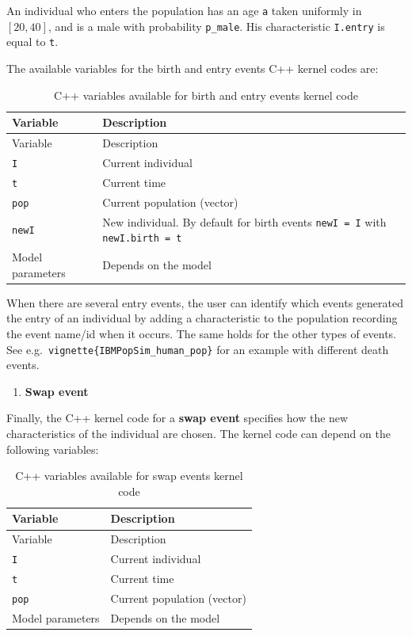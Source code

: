 \begin{Shaded}
\begin{Highlighting}[]
\end{Highlighting}
\end{Shaded}

An individual who enters the population has an age \texttt{a} taken uniformly in \([20,40]\), and is a male with probability \texttt{p\_male}. His characteristic \texttt{I.entry} is equal to \texttt{t}.

The available variables for the birth and entry events C++ kernel codes are:

\begin{longtable}[]{@{}ll@{}}
\caption{C++ variables available for birth and entry events kernel code}\tabularnewline
\toprule
Variable & Description\tabularnewline
\midrule
\endfirsthead
\toprule
Variable & Description\tabularnewline
\midrule
\endhead
\texttt{I} & Current individual\tabularnewline
\texttt{t} & Current time\tabularnewline
\texttt{pop} & Current population (vector)\tabularnewline
\texttt{newI} & New individual. By default for birth events \texttt{newI\ =\ I} with \texttt{newI.birth\ =\ t}\tabularnewline
Model parameters & Depends on the model\tabularnewline
\bottomrule
\end{longtable}

When there are several entry events, the user can identify which events generated the entry of an individual by adding a characteristic to the population recording the event name/id when it occurs. The same holds for the other types of events. See e.g.~\texttt{vignette\{\textquotesingle{}IBMPopSim\_human\_pop\textquotesingle{}\}} for an example with different death events.

\begin{enumerate}
\def\labelenumi{\arabic{enumi}.}
\setcounter{enumi}{4}
\tightlist
\item
  \textbf{Swap event}
\end{enumerate}

Finally, the C++ kernel code for a \textbf{swap event} specifies how the new characteristics of the individual are chosen. The kernel code can depend on the following variables:

\begin{longtable}[]{@{}ll@{}}
\caption{C++ variables available for swap events kernel code}\tabularnewline
\toprule
Variable & Description\tabularnewline
\midrule
\endfirsthead
\toprule
Variable & Description\tabularnewline
\midrule
\endhead
\texttt{I} & Current individual\tabularnewline
\texttt{t} & Current time\tabularnewline
\texttt{pop} & Current population (vector)\tabularnewline
Model parameters & Depends on the model\tabularnewline
\bottomrule
\end{longtable}

